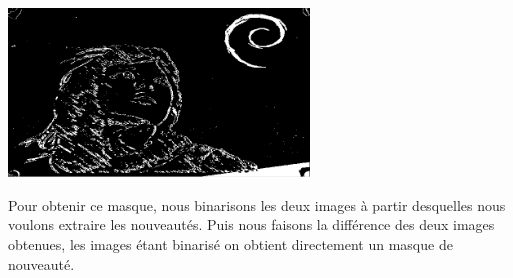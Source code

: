 \begin{center}
\includegraphics[width=8cm]{images/masqueDiff.png}\newline
{}
\end{center}

Pour obtenir ce masque, nous binarisons les deux images à partir desquelles nous voulons extraire les nouveautés. Puis nous faisons la différence des deux images obtenues, les images étant binarisé on obtient directement un masque de nouveauté.


